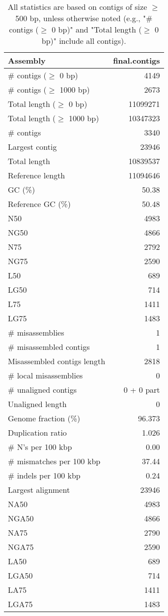 \documentclass[12pt,a4paper]{article}
\begin{document}
\begin{table}[ht]
\begin{center}
\caption{All statistics are based on contigs of size $\geq$ 500 bp, unless otherwise noted (e.g., "\# contigs ($\geq$ 0 bp)" and "Total length ($\geq$ 0 bp)" include all contigs).}
\begin{tabular}{|l*{1}{|r}|}
\hline
Assembly & final.contigs \\ \hline
\# contigs ($\geq$ 0 bp) & 4149 \\ \hline
\# contigs ($\geq$ 1000 bp) & 2673 \\ \hline
Total length ($\geq$ 0 bp) & 11099271 \\ \hline
Total length ($\geq$ 1000 bp) & 10347323 \\ \hline
\# contigs & 3340 \\ \hline
Largest contig & 23946 \\ \hline
Total length & 10839537 \\ \hline
Reference length & 11094646 \\ \hline
GC (\%) & 50.38 \\ \hline
Reference GC (\%) & 50.48 \\ \hline
N50 & 4983 \\ \hline
NG50 & 4866 \\ \hline
N75 & 2792 \\ \hline
NG75 & 2590 \\ \hline
L50 & 689 \\ \hline
LG50 & 714 \\ \hline
L75 & 1411 \\ \hline
LG75 & 1483 \\ \hline
\# misassemblies & 1 \\ \hline
\# misassembled contigs & 1 \\ \hline
Misassembled contigs length & 2818 \\ \hline
\# local misassemblies & 0 \\ \hline
\# unaligned contigs & 0 + 0 part \\ \hline
Unaligned length & 0 \\ \hline
Genome fraction (\%) & 96.373 \\ \hline
Duplication ratio & 1.026 \\ \hline
\# N's per 100 kbp & 0.00 \\ \hline
\# mismatches per 100 kbp & 37.44 \\ \hline
\# indels per 100 kbp & 0.24 \\ \hline
Largest alignment & 23946 \\ \hline
NA50 & 4983 \\ \hline
NGA50 & 4866 \\ \hline
NA75 & 2790 \\ \hline
NGA75 & 2590 \\ \hline
LA50 & 689 \\ \hline
LGA50 & 714 \\ \hline
LA75 & 1411 \\ \hline
LGA75 & 1483 \\ \hline
\end{tabular}
\end{center}
\end{table}
\end{document}
